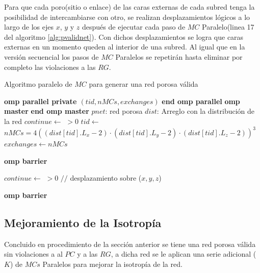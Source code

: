 Para que cada poro(sitio o enlace) de las caras externas de cada subred tenga la posibilidad de intercambiarse con otro, se realizan  desplazamientos lógicos a lo largo de los ejes $x$, $y$ y $z$ después de ejecutar cada paso de $MC$ Paralelo(linea 17 del algoritmo \ref{alg:pvalidnet}). Con dichos desplazamientos se logra que caras externas en un momento queden al interior de una subred. Al igual que en la versión  secuencial los pasos de $MC$ Paralelos se repetirán hasta eliminar por completo las violaciones a las $RG$.\\

\begin{algorithm}
\caption{Algoritmo paralelo de $MC$ para generar una red porosa válida}\label{alg:pvalidnet}
\begin{algorithmic}[1]
    {\textbf{omp parallel private $(tid,nMCs,exchanges)$}}
    {\textbf{end omp parallel}}    
    {\textbf{omp master}}
    {\textbf{end omp master}}
\Require $pnet$: red porosa
\Require $dist$: Arreglo con la distribución de la red
\State $continue \gets$  $ > 0$
\ompparallel
	\State $tid \gets $ 
	\State $nMCs=4(( dist[tid].L_x  - 2) \cdot (dist[tid].L_y - 2) \cdot (dist[tid].L_z - 2))^3$
		\State $exchanges \gets nMCs$
			\State {}
				\State {}
			\EndIf
		\EndWhile
		
		\State \textbf{omp barrier}
		
		\ompmaster
			\State $continue \gets$  $ > 0$		
				\State {} {$//$ desplazamiento sobre ($x,y,z$)}
			\EndIf
		\eompmaster

		\State \textbf{omp barrier}
	\EndWhile
\eompparallel
\end{algorithmic}
\end{algorithm}

\subsection{Mejoramiento de la Isotropía}
\label{subsec:paisotropy}
Concluido en procedimiento de la sección anterior se tiene una red porosa válida sin violaciones a al  $PC$ y a las $RG$, a dicha red se le aplican una serie adicional ($K$) de $MCs$ Paralelos para mejorar la isotropía de la red.

